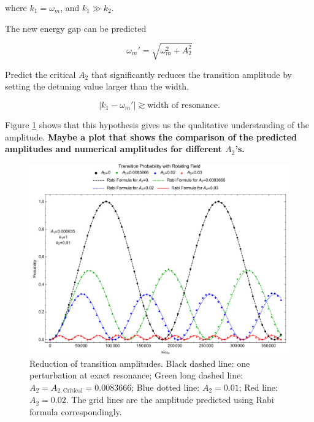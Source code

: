 \documentclass[%
preprint,
 amsmath,amssymb,
 aps,
]{revtex4-1}
\begin{document}
where $k_1 = \omega_m$, and $k_1 \gg k_2$.

The new energy gap can be predicted

\begin{equation}
\omega_m' = \sqrt{\omega_m^2 + A_2^2}
\end{equation}

Predict the critical $A_2$ that significantly reduces the transition amplitude by setting the detuning value larger than the width,

\begin{equation}
\lvert k_1 - \omega_m' \rvert \gtrsim \text{width of resonance}.
\end{equation}




Figure \ref{fig-rabi-oscillations-energy-gap-change} shows that this hypothesis gives us the qualitative understanding of the amplitude. {\bf Maybe a plot that shows the comparison of the predicted amplitudes and numerical amplitudes for different $A_2$'s.}


\begin{figure}[!htbp]
                \centering
                \includegraphics[width=\textwidth]{assets/rabi-oscillations-energy-gap-change-k2-0-01}
                \caption{Reduction of transition amplitudes. Black dashed line: one perturbation at exact resonance; Green long dashed line: $A_2=A_{2,\mathrm{Critical}}=0.0083666$; Blue dotted line: $A_2=0.01$; Red line: $A_2=0.02$. The grid lines are the amplitude predicted using Rabi formula correspondingly.}
                \label{fig-rabi-oscillations-energy-gap-change}
\end{figure}
\end{document}
